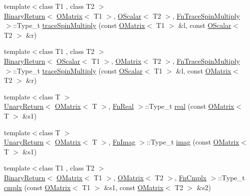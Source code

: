 \begin{DoxyCompactItemize}
\item 
{\footnotesize template$<$class T1 , class T2 $>$ }\\\mbox{\hyperlink{structENSEM_1_1BinaryReturn}{Binary\+Return}}$<$ \mbox{\hyperlink{classENSEM_1_1OMatrix}{O\+Matrix}}$<$ T1 $>$, \mbox{\hyperlink{classENSEM_1_1OScalar}{O\+Scalar}}$<$ T2 $>$, \mbox{\hyperlink{structENSEM_1_1FnTraceSpinMultiply}{Fn\+Trace\+Spin\+Multiply}} $>$\+::Type\+\_\+t \mbox{\hyperlink{group__obsmatrix_gaff573e35e3b3904f735317f67cae28f6}{trace\+Spin\+Multiply}} (const \mbox{\hyperlink{classENSEM_1_1OMatrix}{O\+Matrix}}$<$ T1 $>$ \&l, const \mbox{\hyperlink{classENSEM_1_1OScalar}{O\+Scalar}}$<$ T2 $>$ \&r)
\item 
{\footnotesize template$<$class T1 , class T2 $>$ }\\\mbox{\hyperlink{structENSEM_1_1BinaryReturn}{Binary\+Return}}$<$ \mbox{\hyperlink{classENSEM_1_1OScalar}{O\+Scalar}}$<$ T1 $>$, \mbox{\hyperlink{classENSEM_1_1OMatrix}{O\+Matrix}}$<$ T2 $>$, \mbox{\hyperlink{structENSEM_1_1FnTraceSpinMultiply}{Fn\+Trace\+Spin\+Multiply}} $>$\+::Type\+\_\+t \mbox{\hyperlink{group__obsmatrix_gaa152d77bf9e2e211ff35c733b40f6c64}{trace\+Spin\+Multiply}} (const \mbox{\hyperlink{classENSEM_1_1OScalar}{O\+Scalar}}$<$ T1 $>$ \&l, const \mbox{\hyperlink{classENSEM_1_1OMatrix}{O\+Matrix}}$<$ T2 $>$ \&r)
\item 
{\footnotesize template$<$class T $>$ }\\\mbox{\hyperlink{structENSEM_1_1UnaryReturn}{Unary\+Return}}$<$ \mbox{\hyperlink{classENSEM_1_1OMatrix}{O\+Matrix}}$<$ T $>$, \mbox{\hyperlink{structENSEM_1_1FnReal}{Fn\+Real}} $>$\+::Type\+\_\+t \mbox{\hyperlink{group__obsmatrix_gaa89ce5a88c3ccb5020ce1319e041cacd}{real}} (const \mbox{\hyperlink{classENSEM_1_1OMatrix}{O\+Matrix}}$<$ T $>$ \&s1)
\item 
{\footnotesize template$<$class T $>$ }\\\mbox{\hyperlink{structENSEM_1_1UnaryReturn}{Unary\+Return}}$<$ \mbox{\hyperlink{classENSEM_1_1OMatrix}{O\+Matrix}}$<$ T $>$, \mbox{\hyperlink{structENSEM_1_1FnImag}{Fn\+Imag}} $>$\+::Type\+\_\+t \mbox{\hyperlink{group__obsmatrix_ga227c6429f15ec19a09a182551be38dad}{imag}} (const \mbox{\hyperlink{classENSEM_1_1OMatrix}{O\+Matrix}}$<$ T $>$ \&s1)
\item 
{\footnotesize template$<$class T1 , class T2 $>$ }\\\mbox{\hyperlink{structENSEM_1_1BinaryReturn}{Binary\+Return}}$<$ \mbox{\hyperlink{classENSEM_1_1OMatrix}{O\+Matrix}}$<$ T1 $>$, \mbox{\hyperlink{classENSEM_1_1OMatrix}{O\+Matrix}}$<$ T2 $>$, \mbox{\hyperlink{structENSEM_1_1FnCmplx}{Fn\+Cmplx}} $>$\+::Type\+\_\+t \mbox{\hyperlink{group__obsmatrix_ga28de8e5b7b3d990424b77f7d9eeb2ec1}{cmplx}} (const \mbox{\hyperlink{classENSEM_1_1OMatrix}{O\+Matrix}}$<$ T1 $>$ \&s1, const \mbox{\hyperlink{classENSEM_1_1OMatrix}{O\+Matrix}}$<$ T2 $>$ \&s2)

\end{DoxyCompactItemize}
